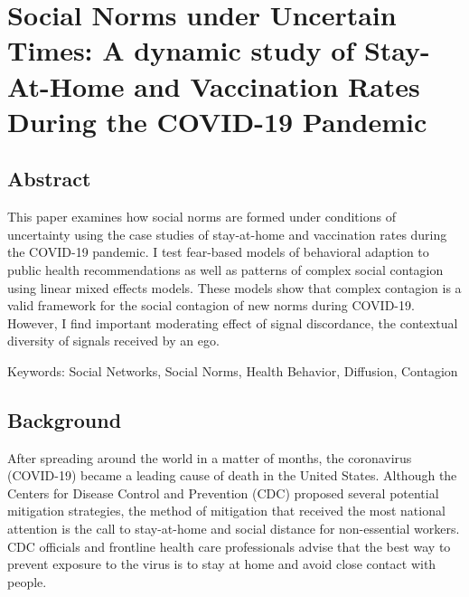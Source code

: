 \hypertarget{paper-3}{%
\chapter{Social Norms under Uncertain Times: A dynamic study of Stay-At-Home and Vaccination Rates During the COVID-19 Pandemic}\label{paper-3}}

\hypertarget{abstract-1}{%
\section{Abstract}\label{abstract-1}}

This paper examines how social norms are formed under conditions of uncertainty
using the case studies of stay-at-home and vaccination rates during the COVID-19
pandemic. I test fear-based models of behavioral adaption to public health
recommendations as well as patterns of complex social contagion using linear
mixed effects models. These models show that complex contagion is a valid
framework for the social contagion of new norms during COVID-19. However, I find
important moderating effect of signal discordance, the contextual diversity of
signals received by an ego.


Keywords: Social Networks, Social Norms, Health Behavior, Diffusion, Contagion

\citep{mirbabaie_etal20, ternullo22}

\hypertarget{background}{%
\section{Background}\label{background}}

After spreading around the world in a matter of months, the coronavirus
(COVID-19) became a leading cause of death in the United States. Although the
Centers for Disease Control and Prevention (CDC) \citeyearpar{centersfordiseasecontrolandpreventionHowProtectYourself2020} proposed several potential mitigation strategies, the method of mitigation that received the most national
attention is the call to stay-at-home and social distance for non-essential
workers. CDC officials and frontline health care professionals advise that the
best way to prevent exposure to the virus is to stay at home and avoid close
contact with people.

